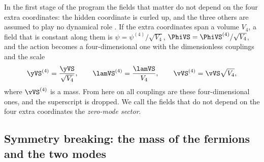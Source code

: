 In the first stage of the program the fields that matter do not depend on the four extra coordinates:
the hidden coordinate is curled up, and the three others are assumed to play no dynamical role
. If the extra
coordinates span a volume $V_4$, a field that is constant along them is
$\psi=\psi^{(4)}/\sqrt{V_4}$, $\PhiVS=\PhiVS^{(4)}/\sqrt{V_4}$, and the action becomes a
four-dimensional one with the dimensionless couplings and the scale
\begin{equation}
\yVS^{(4)}=\frac{\yVS}{\sqrt{V_4}},\qquad\lamVS^{(4)}=\frac{\lamVS}{V_4},\qquad\vVS^{(4)}=\vVS\sqrt{V_4},
\end{equation}
where $\vVS^{(4)}$ is a mass. From here on all couplings are these four-dimensional ones, and the
superscript is dropped. We call the fields that do not depend on the four extra coordinates the
\emph{zero-mode sector}.

\subsection{Symmetry breaking: the mass of the fermions and the two modes}
\label{sec:ssb}

